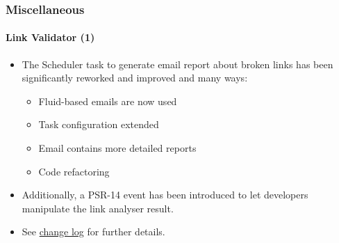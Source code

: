 %

\begin{frame}[fragile]
	\frametitle{Miscellaneous}
	\framesubtitle{Link Validator (1)}


	\begin{itemize}
		\item The Scheduler task to generate email report about broken links
			has been significantly reworked and improved and many ways:

			\begin{itemize}
				\item Fluid-based emails are now used
				\item Task configuration extended
				\item Email contains more detailed reports
				\item Code refactoring
			\end{itemize}

		\item Additionally, a PSR-14 event has been introduced to let developers
			manipulate the link analyser result.

		\item See \href{https://docs.typo3.org/c/typo3/cms-core/master/en-us/Changelog/11.0/Feature-29342-ImproveValidatorTask.html}{change log}
			for further details.

	\end{itemize}

\end{frame}

